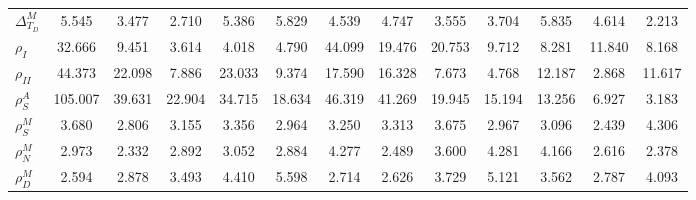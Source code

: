 \begin{center}
\begin{longtable}{lcccccccccccc}
$ {\Delta^{M}_{T_D}}   $	 & 	       5.545	 & 	       3.477	 & 	       2.710	 & 	       5.386	 & 	       5.829	 & 	       4.539	 & 	       4.747	 & 	       3.555	 & 	       3.704	 & 	       5.835	 & 	       4.614	 & 	       2.213 \\ 
$ {\rho_{I}}           $	 & 	      32.666	 & 	       9.451	 & 	       3.614	 & 	       4.018	 & 	       4.790	 & 	      44.099	 & 	      19.476	 & 	      20.753	 & 	       9.712	 & 	       8.281	 & 	      11.840	 & 	       8.168 \\ 
$ {\rho_{II}}          $	 & 	      44.373	 & 	      22.098	 & 	       7.886	 & 	      23.033	 & 	       9.374	 & 	      17.590	 & 	      16.328	 & 	       7.673	 & 	       4.768	 & 	      12.187	 & 	       2.868	 & 	      11.617 \\ 
$ {\rho^{A}_{S}}       $	 & 	     105.007	 & 	      39.631	 & 	      22.904	 & 	      34.715	 & 	      18.634	 & 	      46.319	 & 	      41.269	 & 	      19.945	 & 	      15.194	 & 	      13.256	 & 	       6.927	 & 	       3.183 \\ 
$ {\rho^{M}_{S}}       $	 & 	       3.680	 & 	       2.806	 & 	       3.155	 & 	       3.356	 & 	       2.964	 & 	       3.250	 & 	       3.313	 & 	       3.675	 & 	       2.967	 & 	       3.096	 & 	       2.439	 & 	       4.306 \\ 
$ {\rho^{M}_{N}}       $	 & 	       2.973	 & 	       2.332	 & 	       2.892	 & 	       3.052	 & 	       2.884	 & 	       4.277	 & 	       2.489	 & 	       3.600	 & 	       4.281	 & 	       4.166	 & 	       2.616	 & 	       2.378 \\ 
$ {\rho^{M}_{D}}       $	 & 	       2.594	 & 	       2.878	 & 	       3.493	 & 	       4.410	 & 	       5.598	 & 	       2.714	 & 	       2.626	 & 	       3.729	 & 	       5.121	 & 	       3.562	 & 	       2.787	 & 	       4.093 \\ 
\end{longtable}
 \end{center}
